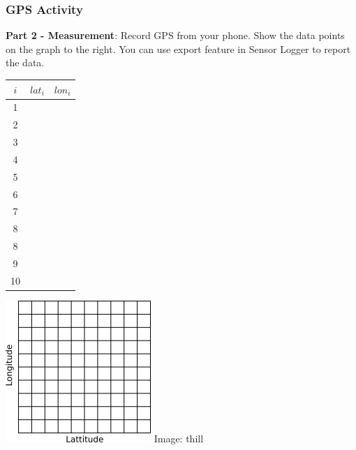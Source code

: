\documentclass[fleqn]{beamer} %
\newcommand{\sectionIsubsectionIVtitle}{GPS Activity}
\begin{document}
			\begin{frame}
				\frametitle{\sectionIsubsectionIVtitle}

				\scriptsize
				{\bf Part 2 - Measurement}: Record GPS from your phone. Show the data points on the graph to the right. You can use export feature in Sensor Logger to report the data.  \\
				
				\begin{multicols}{2}

					\setlength{\tabcolsep}{20pt}
					\renewcommand{\arraystretch}{1.4}
					\begin{tabular}{|c|c|c|} \hline
					$i$ & $lat_i$ & $lon_i$ \\\hline
					  1  & &              \\ \hline
					  2  & &              \\ \hline
					  3  & &              \\ \hline
					  4  & &              \\ \hline
					  5  & &              \\ \hline
					  6  & &              \\ \hline
					  7  & &              \\ \hline
					  8  & &              \\ \hline
					  8  & &              \\ \hline		
					  9  & &              \\ \hline
		             10  & &              \\ \hline
					\end{tabular}

					\includegraphics[scale=1]{images/lat_lon_grid.png}
					{\tiny Image: thill}
				\end{multicols}	
				
			\end{frame}
	
\end{document}
